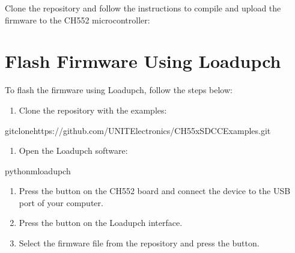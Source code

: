 \documentclass[letterpaper,10pt,english]{sphinxmanual}
\begin{document}
\sphinxAtStartPar
Clone the repository and follow the instructions to compile and upload the firmware to the CH552 microcontroller:




\section{Flash Firmware Using Loadupch}
\label{\detokenize{examples:flash-firmware-using-loadupch}}
\sphinxAtStartPar
To flash the firmware using Loadupch, follow the steps below:
\begin{enumerate}
%
\item {} 
\sphinxAtStartPar
Clone the repository with the examples:

\end{enumerate}

\begin{sphinxVerbatim}[commandchars=\\\{\}]
gitclonehttps://github.com/UNIT\PYGZhy{}Electronics/CH55x\PYGZus{}SDCC\PYGZus{}Examples.git
\end{sphinxVerbatim}
\begin{enumerate}
%
\setcounter{enumi}{1}
\item {} 
\sphinxAtStartPar
Open the Loadupch software:

\end{enumerate}

\begin{sphinxVerbatim}[commandchars=\\\{\}]
python\PYGZhy{}mloadupch
\end{sphinxVerbatim}
\begin{enumerate}
%
\setcounter{enumi}{2}
\item {} 
\sphinxAtStartPar
Press the  button on the CH552 board and connect the device to the USB port of your computer.

\item {} 
\sphinxAtStartPar
Press the  button on the Loadupch interface.

\item {} 
\sphinxAtStartPar
Select the firmware file from the  repository and press the  button.

\end{enumerate}
\end{document}
